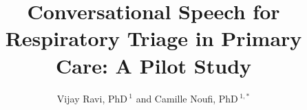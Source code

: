 \documentclass[utf8]{FrontiersinHarvard} %
\def\firstAuthorLast{Ravi {et~al.}}
\def\Authors{Vijay Ravi, PhD\,$^{1}$ and Camille Noufi, PhD\,$^{1,*}$}
\begin{document}
\onecolumn
{}

\title{Conversational Speech for Respiratory Triage in Primary Care: A Pilot Study}

\author[\firstAuthorLast ]{\Authors} %
\address{} %
\correspondance{} %

\extraAuth{}%


\maketitle
\end{document}
